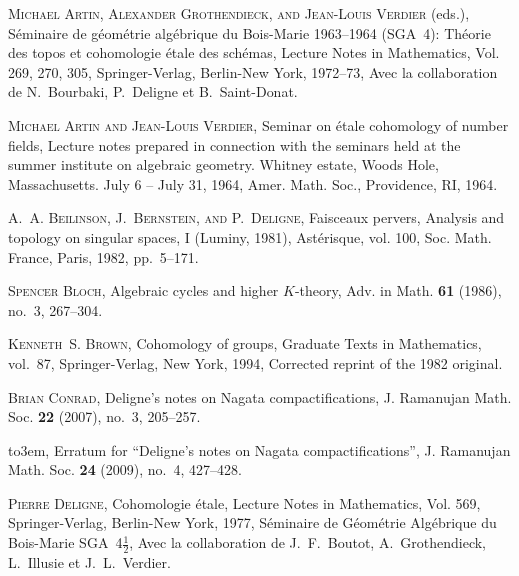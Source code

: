 \documentclass[leqno,12pt]{article}
\theoremstyle{plain}
\theoremstyle{definition}
\begin{document}
\begin{thebibliography}{99}

\providecommand{\bysame}{\leavevmode\hbox to3em{\hrulefill}\thinspace}

  \textsc{Michael Artin, Alexander Grothendieck, and Jean-Louis Verdier} (eds.),
  S{\'e}minaire de g{\'e}om{\'e}trie alg{\'e}brique du {B}ois-{M}arie
  1963--1964 ({SGA}~4): {T}h\'eorie des topos et cohomologie \'etale des
  sch\'emas, Lecture Notes in Mathematics, Vol. 269, 270, 305,
  Springer-Verlag, Berlin-New York, 1972--73, Avec la collaboration de
  {N}.~{B}ourbaki, {P}.~{D}eligne et {B}.~{S}aint-{D}onat.

  \textsc{Michael Artin and Jean-Louis Verdier}, Seminar on \'{e}tale cohomology
  of number fields, Lecture notes prepared in connection with the seminars held
  at the summer institute on algebraic geometry. Whitney estate, {W}oods {H}ole,
  {M}assachusetts. July 6 -- {J}uly 31, 1964, Amer. Math. Soc., Providence, RI,
  1964.

  \textsc{A.~A. Beilinson, J.~Bernstein, and P.~Deligne}, Faisceaux pervers,
  Analysis and topology on singular spaces, {I} ({L}uminy, 1981),
  Ast\'{e}risque, vol. 100, Soc. Math. France, Paris, 1982, pp.~5--171.

  \textsc{Spencer Bloch}, Algebraic cycles and higher {$K$}-theory, Adv. in
  Math. \textbf{61} (1986), no.~3, 267--304.

  \textsc{Kenneth~S. Brown}, Cohomology of groups, Graduate Texts in
  Mathematics, vol.~87, Springer-Verlag, New York, 1994, Corrected reprint of
  the 1982 original.

  \textsc{Brian Conrad}, Deligne's notes on {N}agata compactifications,
  J. Ramanujan Math. Soc. \textbf{22} (2007), no.~3, 205--257.

  \bysame, Erratum for ``{D}eligne's notes on {N}agata compactifications'',
  J. Ramanujan Math. Soc. \textbf{24} (2009), no.~4, 427--428.

  \textsc{Pierre Deligne}, Cohomologie \'etale, Lecture Notes in Mathematics, Vol.
  569, Springer-Verlag, Berlin-New York, 1977, S{\'e}minaire de
  G{\'e}om{\'e}trie Alg{\'e}brique du {B}ois-{M}arie {SGA}~4$\frac{1}{2}$, Avec
  la collaboration de {J}.~{F}.~{B}outot, {A}.~{G}rothendieck, {L}.~Illusie et
  {J}.~{L}.~{V}erdier.


\end{thebibliography}
\end{document}
